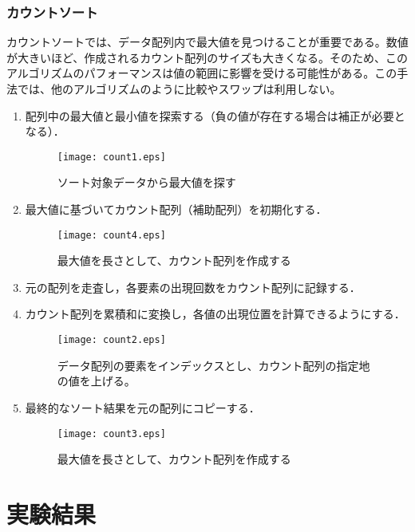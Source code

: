 \documentclass[a4j, 11pt]{jarticle}
\begin{document}
\subsubsection{カウントソート}
カウントソートでは、データ配列内で最大値を見つけることが重要である。数値が大きいほど、作成されるカウント配列のサイズも大きくなる。そのため、このアルゴリズムのパフォーマンスは値の範囲に影響を受ける可能性がある。この手法では、他のアルゴリズムのように比較やスワップは利用しない\cite{gfg:countingsort2024}。\
\begin{enumerate}
  \item 配列中の最大値と最小値を探索する（負の値が存在する場合は補正が必要となる）．
  \begin{figure}[H]
    \centering
    \texttt{[image: count1.eps]}
    \caption{ソート対象データから最大値を探す}
  \end{figure}
  \item 最大値に基づいてカウント配列（補助配列）を初期化する．
  \begin{figure}[H]
    \centering
    \texttt{[image: count4.eps]}
    \caption{最大値を長さとして、カウント配列を作成する}
  \end{figure}
  \item 元の配列を走査し，各要素の出現回数をカウント配列に記録する．
  \item カウント配列を累積和に変換し，各値の出現位置を計算できるようにする．
  \begin{figure}[H]
    \centering
    \texttt{[image: count2.eps]}
    \caption{データ配列の要素をインデックスとし、カウント配列の指定地の値を上げる。}
  \end{figure}
  \newpage
  \item 最終的なソート結果を元の配列にコピーする．
  \begin{figure}[H]
    \centering
    \texttt{[image: count3.eps]}
    \caption{最大値を長さとして、カウント配列を作成する}
  \end{figure}
\end{enumerate}
\newpage
\section{実験結果}
\end{document}
